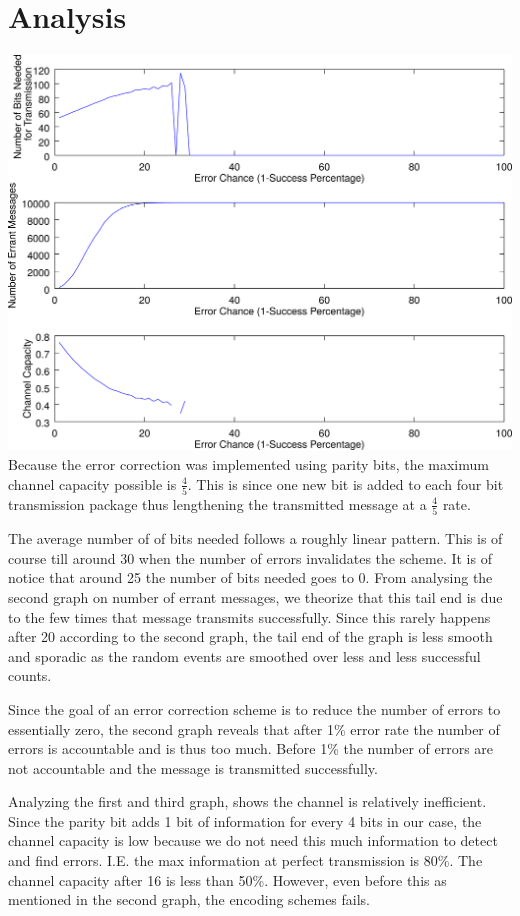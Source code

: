 \documentclass{article}
\begin{document}
   \section{Analysis}
      \includegraphics[width=\textwidth]{images/polyline288.png}
      Because the error correction was implemented using parity bits,
      the maximum channel capacity possible is $\frac{4}{5}$. This is since
      one new bit is added to each four bit transmission package thus lengthening
      the transmitted message at a $\frac{4}{5}$ rate.

      The average number of of bits needed follows a roughly linear pattern. This
      is of course till around 30 when the number of errors invalidates the
      scheme. It is of notice that around 25 the number of bits needed goes to
      0. From analysing the second graph on number of errant messages, we
      theorize that this tail end is due to the few times that message transmits
      successfully. Since this rarely happens after 20 according to the second
      graph, the tail end of the graph is less smooth and sporadic as the
      random events are smoothed over less and less successful counts.

      Since the goal of an error correction scheme is to reduce the number of
      errors to essentially zero, the second graph reveals that after 1\% error
      rate the number of errors is accountable and is thus too much. Before 1\%
      the number of errors are not accountable and the message is transmitted
      successfully.

      Analyzing the first and third graph, shows the channel is relatively
      inefficient. Since the parity bit adds 1 bit of information for every 4 bits
      in our case, the channel capacity is low because we do not need this much
      information to detect and find errors. I.E. the max information at perfect
      transmission is 80\%. The channel capacity after 16 is less than 50\%.
      However, even before this as mentioned in the second graph, the encoding
      schemes fails.
\end{document}
